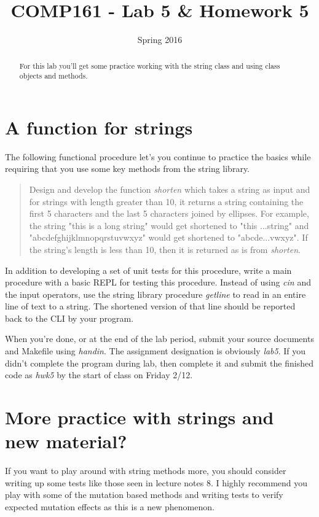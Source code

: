 \documentclass[]{tufte-handout}
\title{COMP161 - Lab 5 \& Homework 5}
\author{}
\date{Spring 2016}
\begin{document}
\maketitle

\begin{abstract}
For this lab you'll get some practice working with the string class and using class objects and methods. 
\end{abstract}

\section{ A function for strings }

The following functional procedure let's you continue to practice the basics while requiring that you use some key methods from the string library. 
\begin{quote}
Design and develop the function \textit{shorten} which takes a string as input and for strings with length greater than 10, it returns a string containing the first 5 characters and the last 5 characters joined by ellipses. For example, the string "this is a long string" would get shortened to "this ...string" and "abcdefghijklmnopqrstuvwxyz" would get shortened to "abcde...vwxyz". If the string's length is less than 10, then it is returned as is from \textit{shorten}. 
\end{quote}
In addition to developing a set of unit tests for this procedure, write a main procedure with a basic REPL for testing this procedure. Instead of using \textit{cin} and the input operators, use the string library procedure \textit{getline} to read in an entire line of text to a string. The shortened version of that line should be reported back to the CLI by your program.

When you're done, or at the end of the lab period, submit your source documents and Makefile using \textit{handin}. The assignment designation is obviously \textit{lab5}. If you didn't complete the program during lab, then complete it and submit the finished code as \textit{hwk5} by the start of class on Friday 2/12.

\section{ More practice with strings and new material? }

If you want to play around with string methods more, you should consider writing up some tests like those seen in lecture notes 8. I highly recommend you play with some of the mutation based methods and writing tests to verify expected mutation effects as this is a new phenomenon.
\end{document}
